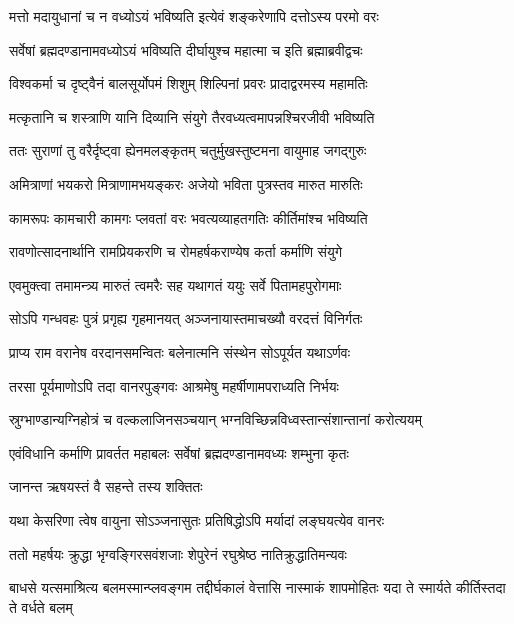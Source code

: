 \twolineshloka
{मत्तो मदायुधानां च न वध्योऽयं भविष्यति}
{इत्येवं शङ्करेणापि दत्तोऽस्य परमो वरः} %

\twolineshloka
{सर्वेषां ब्रह्मदण्डानामवध्योऽयं भविष्यति}
{दीर्घायुश्च महात्मा च इति ब्रह्माब्रवीद्वचः} %

\twolineshloka
{विश्वकर्मा च दृष्ट्वैनं बालसूर्योपमं शिशुम्}
{शिल्पिनां प्रवरः प्रादाद्वरमस्य महामतिः} %

\twolineshloka
{मत्कृतानि च शस्त्राणि यानि दिव्यानि संयुगे}
{तैरवध्यत्वमापन्नश्चिरजीवी भविष्यति} %

\twolineshloka
{ततः सुराणां तु वरैर्दृष्ट्वा ह्येनमलङ्कृतम्}
{चतुर्मुखस्तुष्टमना वायुमाह जगद्गुरुः} %

\twolineshloka
{अमित्राणां भयकरो मित्राणामभयङ्करः}
{अजेयो भविता पुत्रस्तव मारुत मारुतिः} %

\twolineshloka
{कामरूपः कामचारी कामगः प्लवतां वरः}
{भवत्यव्याहतगतिः कीर्तिमांश्च भविष्यति} %

\twolineshloka
{रावणोत्सादनार्थानि रामप्रियकरणि च}
{रोमहर्षकराण्येष कर्ता कर्माणि संयुगे} %

\twolineshloka
{एवमुक्त्वा तमामन्त्र्य मारुतं त्वमरैः सह}
{यथागतं ययुः सर्वे पितामहपुरोगमाः} %

\twolineshloka
{सोऽपि गन्धवहः पुत्रं प्रगृह्य गृहमानयत्}
{अञ्जनायास्तमाचख्यौ वरदत्तं विनिर्गतः} %

\twolineshloka
{प्राप्य राम वरानेष वरदानसमन्वितः}
{बलेनात्मनि संस्थेन सोऽपूर्यत यथाऽर्णवः} %

\twolineshloka
{तरसा पूर्यमाणोऽपि तदा वानरपुङ्गवः}
{आश्रमेषु महर्षीणामपराध्यति निर्भयः} %

\twolineshloka
{स्रुग्भाण्डान्यग्निहोत्रं च वल्कलाजिनसञ्चयान्}
{भग्नविच्छिन्नविध्वस्तान्संशान्तानां करोत्ययम्} %

\twolineshloka
{एवंविधानि कर्माणि प्रावर्तत महाबलः}
{सर्वेषां ब्रह्मदण्डानामवध्यः शम्भुना कृतः} %

\onelineshloka
{जानन्त ऋषयस्तं वै सहन्ते तस्य शक्तितः} %

\twolineshloka
{यथा केसरिणा त्वेष वायुना सोऽञ्जनासुतः}
{प्रतिषिद्धोऽपि मर्यादां लङ्घयत्येव वानरः} %

\twolineshloka
{ततो महर्षयः क्रुद्धा भृग्वङ्गिरसवंशजाः}
{शेपुरेनं रघुश्रेष्ठ नातिक्रुद्धातिमन्यवः} %

\threelineshloka
{बाधसे यत्समाश्रित्य बलमस्मान्प्लवङ्गम}
{तद्दीर्घकालं वेत्तासि नास्माकं शापमोहितः}
{यदा ते स्मार्यते कीर्तिस्तदा ते वर्धते बलम्} %

